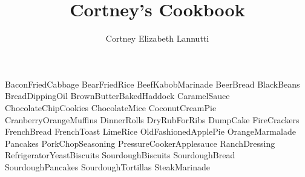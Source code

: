 \documentclass[a4paper, titlepage]{book}
\title{Cortney's Cookbook}
\author{Cortney Elizabeth Lannutti}
\date{}
\begin{document}
\maketitle
{}
\tableofcontents
\newpage
{}

{BaconFriedCabbage}
{BearFriedRice}
{BeefKabobMarinade}
{BeerBread}
{BlackBeans}
{BreadDippingOil}
{BrownButterBakedHaddock}
{CaramelSauce}
{ChocolateChipCookies}
{ChocolateMice}
{CoconutCreamPie}
{CranberryOrangeMuffins}
{DinnerRolls}
{DryRubForRibs}
{DumpCake}
{FireCrackers}
{FrenchBread}
{FrenchToast}
{LimeRice}
{OldFashionedApplePie}
{OrangeMarmalade}
{Pancakes}
{PorkChopSeasoning}
{PressureCookerApplesauce}
{RanchDressing}
{RefrigeratorYeastBiscuits}
{SourdoughBiscuits}
{SourdoughBread}
{SourdoughPancakes}
{SourdoughTortillas}
{SteakMarinade}
\end{document}
